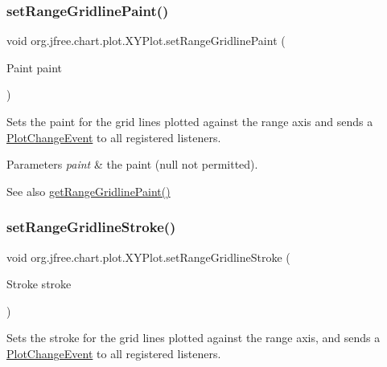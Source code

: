 \subsubsection{\texorpdfstring{set\+Range\+Gridline\+Paint()}{setRangeGridlinePaint()}}
{\footnotesize\ttfamily void org.\+jfree.\+chart.\+plot.\+X\+Y\+Plot.\+set\+Range\+Gridline\+Paint (\begin{DoxyParamCaption}\item[{Paint}]{paint }\end{DoxyParamCaption})}

Sets the paint for the grid lines plotted against the range axis and sends a \mbox{\hyperlink{}{Plot\+Change\+Event}} to all registered listeners.


\begin{DoxyParams}{Parameters}
{\em paint} & the paint ({\ttfamily null} not permitted).\\
\hline
\end{DoxyParams}
\begin{DoxySeeAlso}{See also}
\mbox{\hyperlink{classorg_1_1jfree_1_1chart_1_1plot_1_1_x_y_plot_afe41d7b34fa30b113f4be008f8121b3d}{get\+Range\+Gridline\+Paint()}} 
\end{DoxySeeAlso}
\mbox{\label{classorg_1_1jfree_1_1chart_1_1plot_1_1_x_y_plot_a4356ce9b7c42e0d4b6b5dd7d671b0ac3}} 
\subsubsection{\texorpdfstring{set\+Range\+Gridline\+Stroke()}{setRangeGridlineStroke()}}
{\footnotesize\ttfamily void org.\+jfree.\+chart.\+plot.\+X\+Y\+Plot.\+set\+Range\+Gridline\+Stroke (\begin{DoxyParamCaption}\item[{Stroke}]{stroke }\end{DoxyParamCaption})}

Sets the stroke for the grid lines plotted against the range axis, and sends a \mbox{\hyperlink{}{Plot\+Change\+Event}} to all registered listeners.


